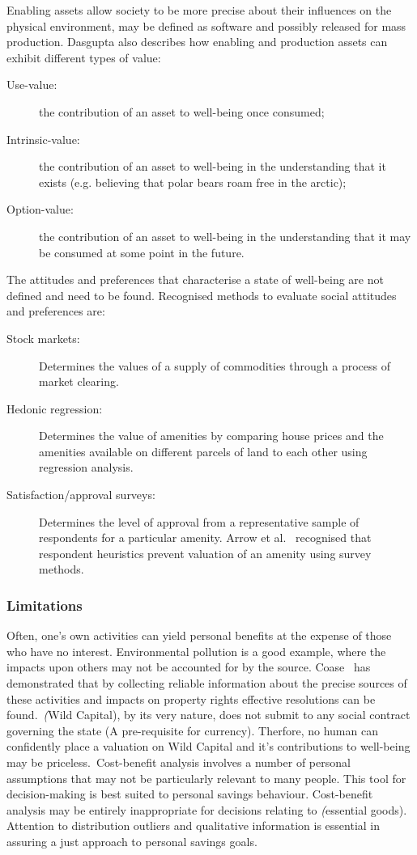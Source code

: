 \documentclass[11pt, oneside]{article}   	%
\begin{document}
Enabling assets allow society to be more precise about their influences on the physical environment, may be defined as software and possibly released for mass production. Dasgupta\cite{pd2} also describes how enabling and production assets can exhibit different types of value:

\begin{description}
\item[Use-value:] the contribution of an asset to well-being once consumed;
\item[Intrinsic-value:] the contribution of an asset to well-being in the understanding that it exists (e.g. believing that polar bears roam free in the arctic);
\item[Option-value:] the contribution of an asset to well-being in the understanding that it may be consumed at some point in the future.
\end{description}

The attitudes and preferences that characterise a state of well-being are not defined and need to be found. Recognised methods to evaluate social attitudes and preferences are:

\begin{description}
\item[Stock markets:] Determines the values of a supply of commodities through a process of market clearing.
\item[Hedonic regression:] Determines the value of amenities by comparing house prices and the amenities available on different parcels of land to each other using regression analysis.
\item[Satisfaction/approval surveys:] Determines the level of approval from a representative sample of respondents for a particular amenity. Arrow et al.~\cite{kja1} recognised that respondent heuristics prevent valuation of an amenity using survey methods.
\end{description}

\subsubsection{Limitations}

Often, one's own activities can yield personal benefits at the expense of those who have no interest.
Environmental pollution is a good example, where the impacts upon others may not be accounted for by the source.
Coase~\cite{rc1} has demonstrated that by collecting reliable information about the precise sources of these activities and impacts on property rights effective resolutions can be found.\
\emph(Wild Capital), by its very nature, does not submit to any social contract governing the state (A pre-requisite for currency).
Therfore, no human can confidently place a valuation on Wild Capital and it's contributions to well-being may be priceless.\
Cost-benefit analysis involves a number of personal assumptions that may not be particularly relevant to many people. This tool for decision-making is best suited to personal savings behaviour.
Cost-benefit analysis may be entirely inappropriate for decisions relating to \emph(essential goods).
Attention to distribution outliers and qualitative information is essential in assuring a just approach to personal savings goals.
\end{document}
